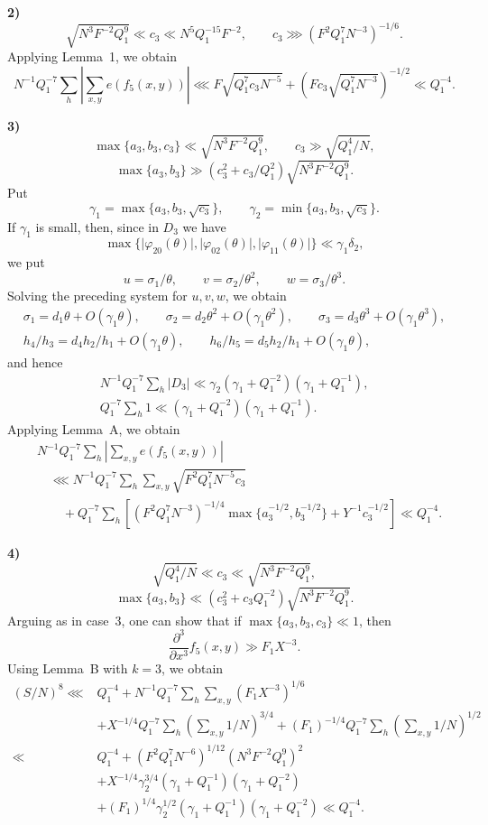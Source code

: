 \documentclass[10pt]{article}
\begin{document}
\medskip
\noindent\textbf{2)}
\[
  \sqrt{N^3F^{-2}Q_1^9}\ll c_3\ll N^5Q_1^{-15}F^{-2},
  \qquad
  c_3\ggg(F^2Q_1^7N^{-3})^{-1/6}.
\]
Applying Lemma~1, we obtain
\[
  N^{-1}Q_1^{-7}\sum_h
  \left\lvert\sum_{x,y}e(f_5(x,y))\right\rvert
  \lll F\sqrt{Q_1^7c_3N^{-5}}
  +(Fc_3\sqrt{Q_1^7N^{-3}})^{-1/2}
  \ll Q_1^{-4}.
\]

\medskip
\noindent\textbf{3)}
\[
  \max\{a_3,b_3,c_3\}\ll\sqrt{N^3F^{-2}Q_1^9},
  \qquad c_3\gg\sqrt{Q_1^4/N},
\]
\[
  \max\{a_3,b_3\}\gg
  (c_3^2+c_3/Q_1^2)\sqrt{N^3F^{-2}Q_1^9}.
\]
Put
\[
  \gamma_1=\max\{a_3,b_3,\sqrt{c_3}\},
  \qquad
  \gamma_2=\min\{a_3,b_3,\sqrt{c_3}\}.
\]
If $\gamma_1$ is small, then, since in $D_3$ we have
\[
  \max\{\lvert\varphi_{20}(\theta)\rvert,
          \lvert\varphi_{02}(\theta)\rvert,
          \lvert\varphi_{11}(\theta)\rvert\}
  \ll\gamma_1\delta_2,
\]
we put
\[
  u=\sigma_1/\theta,\qquad v=\sigma_2/\theta^2,
  \qquad w=\sigma_3/\theta^3.
\]
Solving the preceding system for $u,v,w$, we obtain
\[
\begin{gathered}
 \sigma_1=d_1\theta+O(\gamma_1\theta),\qquad
 \sigma_2=d_2\theta^2+O(\gamma_1\theta^2),\qquad
 \sigma_3=d_3\theta^3+O(\gamma_1\theta^3),\\
 h_4/h_3=d_4h_2/h_1+O(\gamma_1\theta),\qquad
 h_6/h_5=d_5h_2/h_1+O(\gamma_1\theta),
\end{gathered}
\]
and hence
\[
\begin{gathered}
 N^{-1}Q_1^{-7}\sum_h\lvert D_3\rvert
 \ll\gamma_2(\gamma_1+Q_1^{-2})(\gamma_1+Q_1^{-1}),\\
 Q_1^{-7}\sum_h1
 \ll(\gamma_1+Q_1^{-2})(\gamma_1+Q_1^{-1}).
\end{gathered}
\]
Applying Lemma~A, we obtain
\[
\begin{aligned}
&N^{-1}Q_1^{-7}\sum_h
 \left\lvert\sum_{x,y}e(f_5(x,y))\right\rvert\\
&\quad\lll N^{-1}Q_1^{-7}\sum_h\sum_{x,y}
 \sqrt{F^2Q_1^7N^{-5}c_3}\\
&\qquad+Q_1^{-7}\sum_h\left[
 (F^2Q_1^7N^{-3})^{-1/4}
 \max\{a_3^{-1/2},b_3^{-1/2}\}
 +Y^{-1}c_3^{-1/2}
 \right]
 \ll Q_1^{-4}.
\end{aligned}
\]

\medskip
\noindent\textbf{4)}
\[
  \sqrt{Q_1^4/N}\ll c_3\ll\sqrt{N^3F^{-2}Q_1^9},
\]
\[
  \max\{a_3,b_3\}\ll
  (c_3^2+c_3Q_1^{-2})\sqrt{N^3F^{-2}Q_1^9}.
\]
Arguing as in case~3, one can show that if
$\max\{a_3,b_3,c_3\}\ll1$, then
\[
  \frac{\partial^3}{\partial x^3}f_5(x,y)\gg F_1X^{-3}.
\]
Using Lemma~B with $k=3$, we obtain
\[
\begin{aligned}
(S/N)^8\lll{}&Q_1^{-4}
 +N^{-1}Q_1^{-7}\sum_h\sum_{x,y}(F_1X^{-3})^{1/6}\\
&+X^{-1/4}Q_1^{-7}\sum_h
 \left(\sum_{x,y}1/N\right)^{3/4}
 +(F_1)^{-1/4}Q_1^{-7}\sum_h
 \left(\sum_{x,y}1/N\right)^{1/2}\\
\ll{}&Q_1^{-4}
 +(F^2Q_1^7N^{-6})^{1/12}(N^3F^{-2}Q_1^9)^2\\
&+X^{-1/4}\gamma_2^{3/4}
 (\gamma_1+Q_1^{-1})(\gamma_1+Q_1^{-2})\\
&+(F_1)^{1/4}\gamma_2^{1/2}
 (\gamma_1+Q_1^{-1})(\gamma_1+Q_1^{-2})
 \ll Q_1^{-4}.
\end{aligned}
\]
\end{document}

